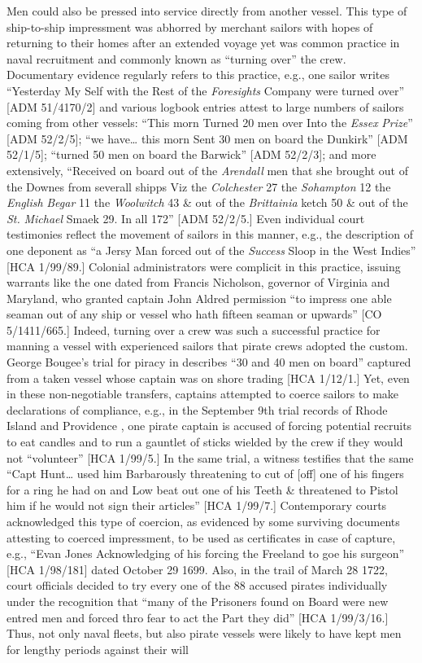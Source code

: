 Men could also be pressed into service directly from another vessel. This type of ship-to-ship impressment was abhorred by merchant sailors with hopes of returning to their homes after an extended voyage yet was common practice in naval recruitment and commonly known as “turning over” the crew. Documentary evidence regularly refers to this practice, e.g., one sailor writes “Yesterday My Self with the Rest of the \textit{Foresights} Company were turned over” [ADM 51/4170/2] and various logbook entries attest to large numbers of sailors coming from other vessels: “This morn Turned 20 men over Into the \textit{Essex} \textit{Prize}” [ADM 52/2/5]; “we have… this morn Sent 30 men on board the Dunkirk” [ADM 52/1/5]; “turned 50 men on board the Barwick” [ADM 52/2/3]; and more extensively, “Received on board out of the \textit{Arendall} men that she brought out of the Downes from severall shipps Viz the \textit{Colchester} 27 the \textit{Sohampton} 12 the \textit{English} \textit{Begar} 11 the \textit{Woolwitch} 43 \& out of the \textit{Brittainia} ketch 50 \& out of the \textit{St.} \textit{Michael} Smaek 29. In all 172” [ADM 52/2/5.] Even individual court testimonies reflect the movement of sailors in this manner, e.g., the description of one deponent as “a Jersy Man forced out of the \textit{Success} Sloop in the West Indies” [HCA 1/99/89.] Colonial administrators were complicit in this practice, issuing warrants like the one dated \citealt{January1699} from Francis Nicholson, governor of Virginia and Maryland, who granted captain John Aldred permission “to impress one able seaman out of any ship or vessel who hath fifteen seaman or upwards” [CO 5/1411/665.] Indeed, turning over a crew was such a successful practice for manning a vessel with experienced sailors that pirate crews adopted the custom. George Bougee’s trial for piracy in \citealt{October1684} describes “30 and 40 men on board” captured from a taken vessel whose captain was on shore trading [HCA 1/12/1.] Yet, even in these non-negotiable transfers, captains attempted to coerce sailors to make declarations of compliance, e.g., in the September 9th trial records of Rhode Island and Providence \citealt{Plantation1725}, one pirate captain is accused of forcing potential recruits to eat candles and to run a gauntlet of sticks wielded by the crew if they would not “volunteer” [HCA 1/99/5.] In the same trial, a witness testifies that the same “Capt Hunt… used him Barbarously threatening to cut of [off] one of his fingers for a ring he had on and Low beat out one of his Teeth \& threatened to Pistol him if he would not sign their articles” [HCA 1/99/7.] Contemporary courts acknowledged this type of coercion, as evidenced by some surviving documents attesting to coerced impressment, to be used as certificates in case of capture, e.g., “Evan Jones Acknowledging of his forcing the Freeland to goe his surgeon” [HCA 1/98/181] dated October 29 1699. Also, in the trail of March 28 1722, court officials decided to try every one of the 88 accused pirates individually under the recognition that “many of the Prisoners found on Board were new entred men and forced thro fear to act the Part they did” [HCA 1/99/3/16.] Thus, not only naval fleets, but also pirate vessels were likely to have kept men for lengthy periods against their will 